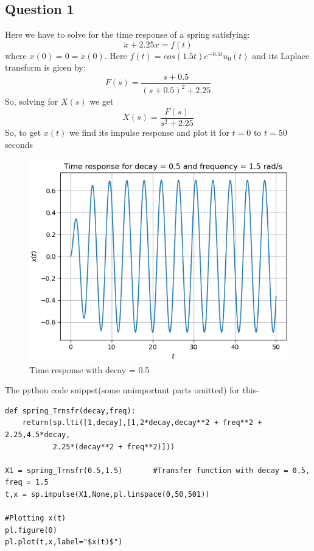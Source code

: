\documentclass[11pt, a4paper]{article}
\begin{document}
\subsection{Question 1}
    Here we have to solve for the time response of a spring satisfying:
    \begin{equation*}
        \ddot x + 2.25x = f(t)
    \end{equation*}
    where $x(0) = 0 = \dot x(0)$. Here $f(t) = cos(1.5t)e^{-0.5t}u_0(t)$ and its Laplace transform is gicen by:
    \begin{equation*}
        F(s) = \frac{s + 0.5}{(s + 0.5)^2 + 2.25}
    \end{equation*}
    So, solving for $X(s)$ we get
    \begin{equation}
        X(s) = \frac{F(s)}{s^2 + 2.25}
    \end{equation}
    So, to get $x(t)$ we find its impulse response and plot it for $t = 0$ to $t = 50$ seconds
    \begin{figure}[!h]
        \centering
        \includegraphics[scale = 0.62]{Figure 1.png}
        \caption{Time response with decay = 0.5}
        \label{fig:Figure 1}
    \end{figure}

The python code snippet(some unimportant parts omitted) for this-
    \begin{verbatim}
def spring_Trnsfr(decay,freq):
    return(sp.lti([1,decay],[1,2*decay,decay**2 + freq**2 + 2.25,4.5*decay,
           2.25*(decay**2 + freq**2)]))
           
X1 = spring_Trnsfr(0.5,1.5)       #Transfer function with decay = 0.5, freq = 1.5
t,x = sp.impulse(X1,None,pl.linspace(0,50,501))

#Plotting x(t)
pl.figure(0)
pl.plot(t,x,label="$x(t)$")
    \end{verbatim}
\end{document}
